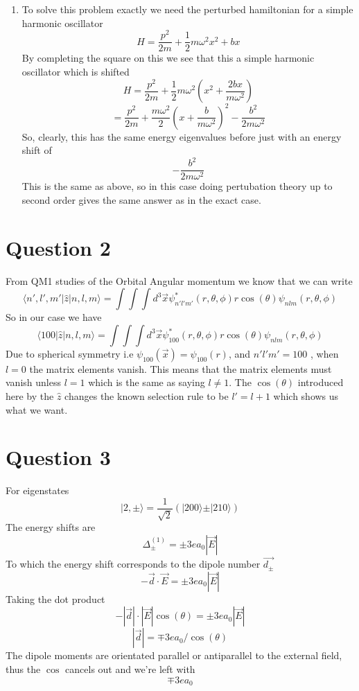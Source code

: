\documentclass[12pt]{article}
\newcommand{\ket}[1]{\vert{#1}\rangle}
\begin{document}
\begin{enumerate}
    \item To solve this problem exactly we need the perturbed hamiltonian for a simple harmonic oscillator 
    $$ H = \frac{p^2}{2m} + \frac{1}{2} m \omega^2 x^2 + bx $$
    By completing the square on this we see that this a simple harmonic oscillator which is shifted 
    $$ H = \frac{p^2}{2m} + \frac{1}{2} m \omega^2 ( x^2 + \frac{2bx}{m \omega^2} ) $$
    $$ = \frac{p^2}{2m} + \frac{m \omega^2}{2} ( x+ \frac{b}{m \omega^2})^2 - \frac{b^2}{2 m \omega^2} $$
    So, clearly, this has the same energy eigenvalues before just with an energy shift of 
    $$ - \frac{b^2}{2 m \omega^2} $$
    This is the same as above, so in this case doing pertubation theory up to second order gives the same answer as in the exact case.
\end{enumerate}

\section*{Question 2}
From QM1 studies of the Orbital Angular momentum we know that we can write 
$$ \langle n', l',m' |\hat{z} | n,l,m \rangle = \int \int \int d^3 \vec{x} \psi_{n' l' m'}^* (r, \theta, \phi ) r \cos (\theta) \psi_{nlm} (r, \theta, \phi) $$
So in our case we have 
$$ \langle 1 0 0  |\hat{z} | n,l,m \rangle = \int \int \int d^3 \vec{x} \psi_{100}^* (r, \theta, \phi ) r \cos (\theta) \psi_{nlm} (r, \theta, \phi) $$
Due to spherical symmetry i.e $ \psi_{100} (\vec{x} ) = \psi_{100} (r)$, and $n' l' m' = 100$ , when $l=0$ the matrix elements vanish. This means that the matrix elements must vanish unless $l=1$ which is the same as saying $l \neq 1$. 
The $\cos (\theta)$ introduced here by the $\hat{z}$ changes the known selection rule to be $l' = l+1$ which shows us what we want. 


\section*{Question 3}
For eigenstates 
$$ \ket{2, \pm} = \frac{1}{\sqrt{2}} (\ket{200} \pm \ket{210} ) $$
The energy shifts are
$$ \Delta_{\pm}^{(1)} = \pm 3 e a_0 | \vec{E} | $$
To which the energy shift corresponds to the dipole number $\vec{d_{\pm} } $
$$ - \vec{d} \cdot \vec{E} = \pm 3 e a_0 | \vec{E} | $$
Taking the dot product 
$$ - |\vec{d} | \cdot | \vec{E} | \cos(\theta) = \pm 3 e a_0 | \vec{E} | $$
$$ | \vec{d}| = \mp 3 e a_0 / \cos (\theta) $$
The dipole moments are orientated parallel or antiparallel to the external field, thus the $\cos$ cancels out and we're left with 
$$ \mp 3 e a_0 $$
\end{document}
